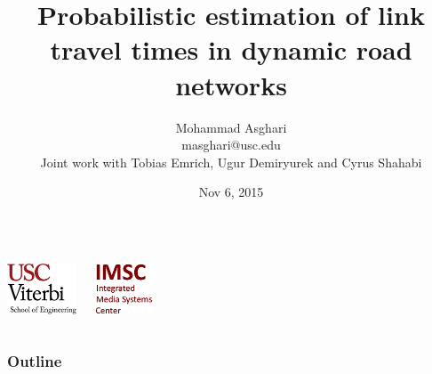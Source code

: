 \documentclass[t]{beamer}
\begin{document}
\graphicspath{ {../Manuscript/figures/}{Graphics/} }

\title[USC Viterbi School of Engineering]{Probabilistic estimation of link travel times in dynamic road networks}  
\author[Mohammad Asghari]{Mohammad Asghari\\ \small{masghari@usc.edu}\\ \vspace{0.1in} \tiny{Joint work with Tobias Emrich, Ugur Demiryurek and Cyrus Shahabi}}

\date{Nov 6, 2015} 

\begin{frame}
\titlepage
\begin{columns}
  \begin{center}
    \includegraphics[height=1.5cm]{viterbi_logo.jpg}
  \end{center}
  \begin{center}
    \includegraphics[height=1.5cm]{imsc_logo.jpg}   
  \end{center}
\end{columns} 
\end{frame}

\begin{frame}\frametitle{Outline}\tableofcontents
\end{frame} 
\end{document}
